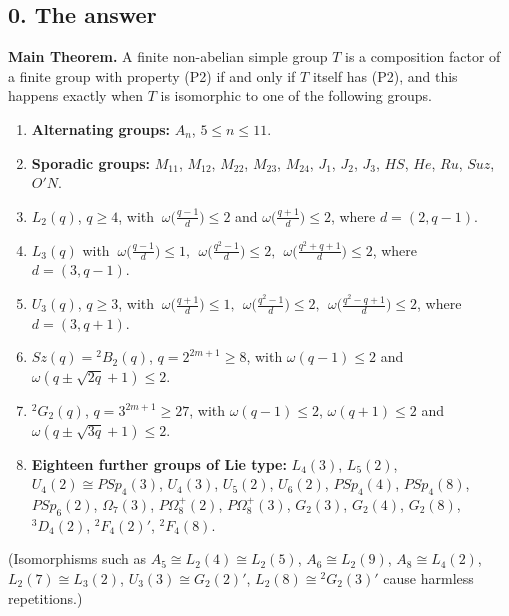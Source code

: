 \documentclass[11pt,a4paper]{article}
\providecommand{\tightlist}{\setlength{\itemsep}{1pt}\setlength{\parskip}{0pt}}
\begin{document}
\subsection{0. The answer}\label{the-answer}

\begin{answerbox}

\textbf{Main Theorem.} A finite non-abelian simple group \(T\) is a
composition factor of a finite group with property (P2) if and only if
\(T\) itself has (P2), and this happens exactly when \(T\) is isomorphic
to one of the following groups.

\begin{enumerate}
\def\labelenumi{\arabic{enumi}.}
\tightlist
\item
  \textbf{Alternating groups:} \(A_n\), \(5\le n\le 11\).
\item
  \textbf{Sporadic groups:} \(M_{11}\), \(M_{12}\), \(M_{22}\),
  \(M_{23}\), \(M_{24}\), \(J_1\), \(J_2\), \(J_3\), \(HS\), \(He\),
  \(Ru\), \(Suz\), \(O'N\).
\item
  \(L_2(q)\), \(q\ge 4\), with \(\ \omega\big(\tfrac{q-1}{d}\big)\le 2\)
  and \(\omega\big(\tfrac{q+1}{d}\big)\le 2\), where \(d=(2,q-1)\).
\item
  \(L_3(q)\) with
  \(\ \omega\big(\tfrac{q-1}{d}\big)\le 1,\ \ \omega\big(\tfrac{q^2-1}{d}\big)\le 2,\ \ \omega\big(\tfrac{q^2+q+1}{d}\big)\le 2\),
  where \(d=(3,q-1)\).
\item
  \(U_3(q)\), \(q\ge 3\), with
  \(\ \omega\big(\tfrac{q+1}{d}\big)\le 1,\ \ \omega\big(\tfrac{q^2-1}{d}\big)\le 2,\ \ \omega\big(\tfrac{q^2-q+1}{d}\big)\le 2\),
  where \(d=(3,q+1)\).
\item
  \(Sz(q)={}^2B_2(q)\), \(q=2^{2m+1}\ge 8\), with \(\omega(q-1)\le 2\)
  and \(\omega(q\pm\sqrt{2q}+1)\le 2\).
\item
  \({}^2G_2(q)\), \(q=3^{2m+1}\ge 27\), with \(\omega(q-1)\le 2\),
  \(\omega(q+1)\le 2\) and \(\omega(q\pm\sqrt{3q}+1)\le 2\).
\item
  \textbf{Eighteen further groups of Lie type:} \(L_4(3)\), \(L_5(2)\),
  \(U_4(2)\cong PSp_4(3)\), \(U_4(3)\), \(U_5(2)\), \(U_6(2)\),
  \(PSp_4(4)\), \(PSp_4(8)\), \(PSp_6(2)\), \(\Omega_7(3)\),
  \(P\Omega_8^+(2)\), \(P\Omega_8^+(3)\), \(G_2(3)\), \(G_2(4)\),
  \(G_2(8)\), \({}^3D_4(2)\), \({}^2F_4(2)'\), \({}^2F_4(8)\).
\end{enumerate}

\end{answerbox}

(Isomorphisms such as \(A_5\cong L_2(4)\cong L_2(5)\),
\(A_6\cong L_2(9)\), \(A_8\cong L_4(2)\), \(L_2(7)\cong L_3(2)\),
\(U_3(3)\cong G_2(2)'\), \(L_2(8)\cong{}^2G_2(3)'\) cause harmless
repetitions.)
\end{document}
